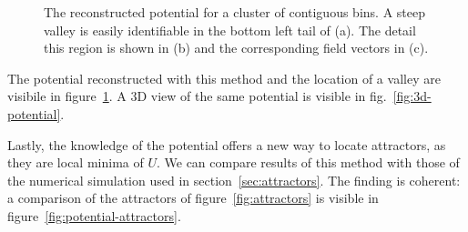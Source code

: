 \documentclass[a4paper]{article}
\begin{document}
\begin{figure}
\begin{minipage}[t]{0.27\linewidth}
  \end{minipage}
  \caption{The reconstructed potential for a cluster of contiguous bins. A steep valley is easily identifiable in the bottom left tail of (a). The detail this region is shown in (b) and the corresponding field vectors in (c).}
  \label{fig:potential}
\end{figure}

The potential reconstructed with this method and the location of a valley are visibile in figure~\ref{fig:potential}. A 3D view of the same potential is visible in fig.~\ref{fig:3d-potential}.

Lastly, the knowledge of the potential offers a new way to locate attractors, as they are local minima of $U$. We can compare results of this method with those of the numerical simulation used in section~\ref{sec:attractors}. The finding is coherent: a comparison of the attractors of figure~\ref{fig:attractors} is visible in figure~\ref{fig:potential-attractors}.

\clearpage
\end{document}
